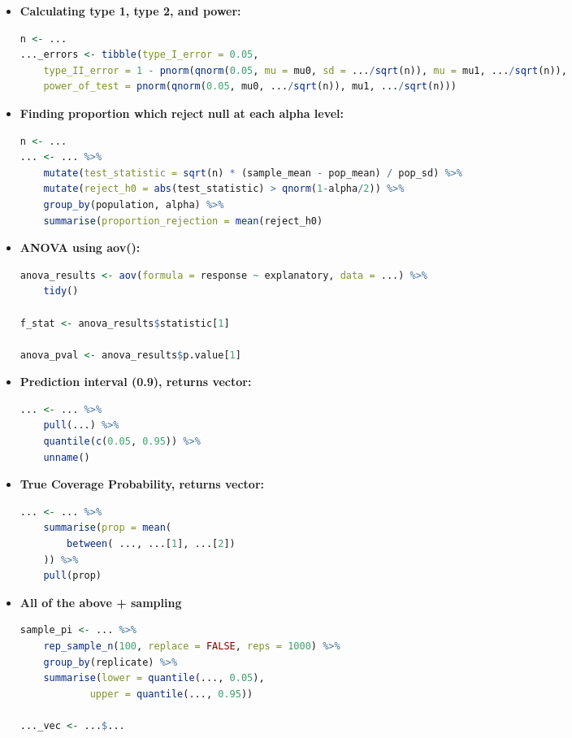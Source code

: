 \documentclass[8pt,landscape,a4paper, fleqn, dvipsnames]{extarticle}
\begin{document}
\begin{multicols*}{4}
\begin{itemize}
        \item \textbf{Calculating type 1, type 2, and power:}
        \begin{lstlisting}[language = R]
n <- ...
..._errors <- tibble(type_I_error = 0.05,
    type_II_error = 1 - pnorm(qnorm(0.05, mu = mu0, sd = .../sqrt(n)), mu = mu1, .../sqrt(n)), 
    power_of_test = pnorm(qnorm(0.05, mu0, .../sqrt(n)), mu1, .../sqrt(n)))
        \end{lstlisting}
        \item \textbf{Finding proportion which reject null at each alpha level:}
        \begin{lstlisting}[language = R]
n <- ...
... <- ... %>% 
    mutate(test_statistic = sqrt(n) * (sample_mean - pop_mean) / pop_sd) %>% 
    mutate(reject_h0 = abs(test_statistic) > qnorm(1-alpha/2)) %>% 
    group_by(population, alpha) %>% 
    summarise(proportion_rejection = mean(reject_h0)
        \end{lstlisting}
        \item \textbf{ANOVA using aov():}
        \begin{lstlisting}[language = R]
anova_results <- aov(formula = response ~ explanatory, data = ...) %>% 
    tidy()

f_stat <- anova_results$statistic[1]

anova_pval <- anova_results$p.value[1]
        \end{lstlisting}
        \item \textbf{Prediction interval (0.9), returns vector:}
        \begin{lstlisting}[language = R]
... <- ... %>% 
    pull(...) %>% 
    quantile(c(0.05, 0.95)) %>% 
    unname()
        \end{lstlisting}
        \item \textbf{True Coverage Probability, returns vector:}
        \begin{lstlisting}[language = R]
... <- ... %>% 
    summarise(prop = mean(
        between( ..., ...[1], ...[2])
    )) %>% 
    pull(prop)
        \end{lstlisting}
        \item \textbf{All of the above + sampling}
        \begin{lstlisting}[language = R]
sample_pi <- ... %>% 
    rep_sample_n(100, replace = FALSE, reps = 1000) %>% 
    group_by(replicate) %>% 
    summarise(lower = quantile(..., 0.05),
            upper = quantile(..., 0.95))
            
..._vec <- ...$...


\end{lstlisting}
\end{itemize}
\end{multicols*}
\end{document}
